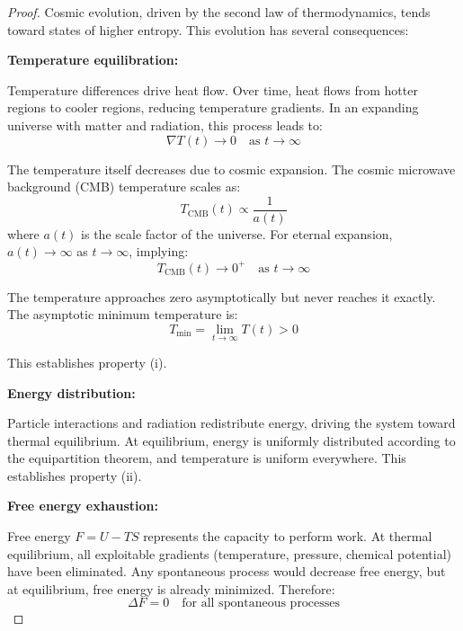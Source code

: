 \documentclass[12pt,a4paper]{article}
\theoremstyle{definition}
\theoremstyle{remark}
\begin{document}
\begin{proof}
Cosmic evolution, driven by the second law of thermodynamics, tends toward states of higher entropy. This evolution has several consequences:

\textbf{Temperature equilibration:}

Temperature differences drive heat flow. Over time, heat flows from hotter regions to cooler regions, reducing temperature gradients. In an expanding universe with matter and radiation, this process leads to:
\begin{equation}
\nabla T(t) \to 0 \quad \text{as } t \to \infty
\end{equation}

The temperature itself decreases due to cosmic expansion. The cosmic microwave background (CMB) temperature scales as:
\begin{equation}
T_{\text{CMB}}(t) \propto \frac{1}{a(t)}
\end{equation}
where $a(t)$ is the scale factor of the universe. For eternal expansion, $a(t) \to \infty$ as $t \to \infty$, implying:
\begin{equation}
T_{\text{CMB}}(t) \to 0^+ \quad \text{as } t \to \infty
\end{equation}

The temperature approaches zero asymptotically but never reaches it exactly. The asymptotic minimum temperature is:
\begin{equation}
T_{\min} = \lim_{t \to \infty} T(t) > 0
\end{equation}

This establishes property (i).

\textbf{Energy distribution:}

Particle interactions and radiation redistribute energy, driving the system toward thermal equilibrium. At equilibrium, energy is uniformly distributed according to the equipartition theorem, and temperature is uniform everywhere. This establishes property (ii).

\textbf{Free energy exhaustion:}

Free energy $F = U - TS$ represents the capacity to perform work. At thermal equilibrium, all exploitable gradients (temperature, pressure, chemical potential) have been eliminated. Any spontaneous process would decrease free energy, but at equilibrium, free energy is already minimized. Therefore:
\begin{equation}
\Delta F = 0 \quad \text{for all spontaneous processes}
\end{equation}


\end{proof}
\end{document}
